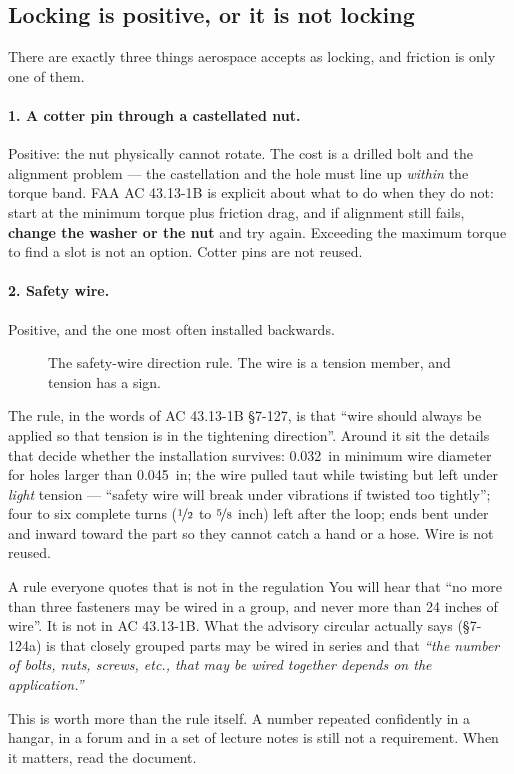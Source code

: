 \documentclass[11pt,a4paper]{article}
\begin{document}
\subsection{Locking is positive, or it is not locking}

There are exactly three things aerospace accepts as locking, and friction is only one of them.

\paragraph{1. A cotter pin through a castellated nut.} Positive: the nut physically cannot rotate.
The cost is a drilled bolt and the alignment problem --- the castellation and the hole must line up
\emph{within} the torque band. FAA AC 43.13-1B is explicit about what to do when they do not:
start at the minimum torque plus friction drag, and if alignment still fails, \textbf{change the
washer or the nut} and try again. Exceeding the maximum torque to find a slot is not an option.
Cotter pins are not reused.

\paragraph{2. Safety wire.} Positive, and the one most often installed backwards.

\begin{figure}[H]\centering
\resizebox{0.95\textwidth}{!}{}
\caption{The safety-wire direction rule. The wire is a tension member, and tension has a sign.}
\label{fig:wire}
\end{figure}

The rule, in the words of AC 43.13-1B \S7-127, is that ``wire should always be applied so that
tension is in the tightening direction''. Around it sit the details that decide whether the
installation survives: \SI{0.032}{in} minimum wire diameter for holes larger than \SI{0.045}{in};
the wire pulled taut while twisting but left under \emph{light} tension --- ``safety wire will break
under vibrations if twisted too tightly''; four to six complete turns ($\nicefrac{1}{2}$ to $\nicefrac{5}{8}$ inch) left
after the loop; ends bent under and inward toward the part so they cannot catch a hand or a hose.
Wire is not reused.

\begin{aerobox}{A rule everyone quotes that is not in the regulation}
You will hear that ``no more than three fasteners may be wired in a group, and never more than
24 inches of wire''. It is not in AC 43.13-1B. What the advisory circular actually says
(\S7-124a) is that closely grouped parts may be wired in series and that \emph{``the number of
bolts, nuts, screws, etc., that may be wired together depends on the application.''}

\medskip
This is worth more than the rule itself. A number repeated confidently in a hangar, in a forum
and in a set of lecture notes is still not a requirement. When it matters, read the document.
\end{aerobox}
\end{document}
